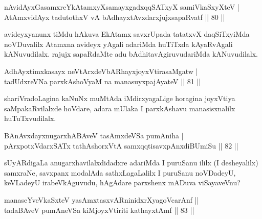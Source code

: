 
\begin{shl}
nAvidAyxGasamxreYkAtamxyXsamayxgadxqqSATxyX samiVkaSxyXteV | \\
AtAmxvidAyx tadutothxV vA bAdhayxtAvxdarxjujxsapaRvatf \hfill||  80 ||  
\end{shl}

\begin{artha}
avideyxyanunx tiMdu hAkuva EkAtamx savxrUpada tatatxvX daqSiTxyiMda noVDuvalilx Atamxna avideyx yAgali adariMda huTiTxda kAyaRvAgali kANuvudilalx. rajujx sapaRdaMte adu bAdhitavAgiruvudariMda kANuvudilalx.
\end{artha}


\begin{shl}
AdhAyxtimxkasayx neVtArxdeVbARhayxjoyxVtirasaMgatw | \\
tadUdxreVNa parxkAshoV\s yaM na manasuyxpajAyateV \hfill||  81 ||  
\end{shl}

\begin{artha}
shariVradoLagina kaNuNx muMtAda iMdirxyagaLige horagina  joyxVtiya saMpakaRvilalxde hoVdare, adara mUlaka I parxkAshavu manasisxnalilx huTuTxvudilalx.
\end{artha}

\begin{shl}
BAnAvxdayxnugarxhABAveV tasAmxdeVSa pumAniha | \\
pArxpotxV\s darxSATx tathA\s shorxVtA samxqqtisavxpAnxdiBUmiSu \hfill||  82 ||  
\end{shl}

\begin{artha}
sUyARdigaLa anugarxhavilalxdidadxre adariMda I puruSanu ililx (I desheyalilx) samxraNe, savxpanx modalAda sathxLagaLalilx I puruSanu noVDadeyU, keVLadeyU irabeVkAguvudu, hAgAdare parxshenx mADuva viSayaveVnu?
\end{artha}

\begin{shl}
manaseYveVkaSxteV yasAmxtasxvARninidxrXyagoVcarAnf ||  \\
tada\footnotemark[1]{}BAveV pumAneVSa kiMjoyxVtiriti kathayxtAmf \hfill ||  83 ||  
\end{shl}


